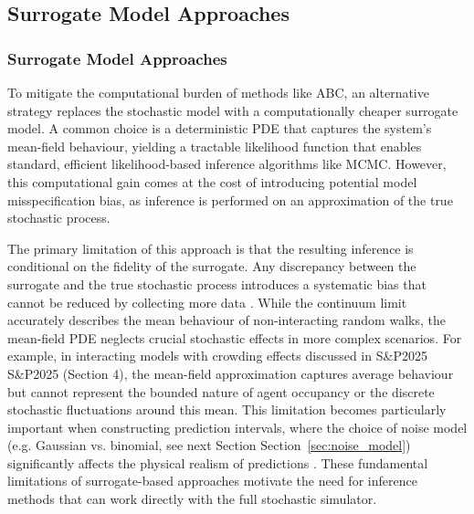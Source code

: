 \documentclass{article}
\newcommand{\SP}{S\&P2025}
\providecommand{\DIFaddtex}[1]{{\protect\color{blue} \sf #1}} %
\providecommand{\DIFdeltex}[1]{{\protect\color{red} \scriptsize #1}} %
\providecommand{\DIFaddbegin}{} %
\providecommand{\DIFaddend}{} %
\providecommand{\DIFdelbegin}{} %
\providecommand{\DIFdelend}{} %
\providecommand{\DIFadd}[1]{\texorpdfstring{\DIFaddtex{#1}}{#1}} %
\providecommand{\DIFdel}[1]{\texorpdfstring{\DIFdeltex{#1}}{}} %
\newcommand{\DIFscaledelfig}{0.5}
\newlength{\DIFdelgraphicswidth} %
\newlength{\DIFdelgraphicsheight} %
\newcommand{\DIFaddincludegraphics}[2][]{{\color{blue}\fbox{\DIFOincludegraphics[#1]{#2}}}} %
\newcommand{\DIFdelincludegraphics}[2][]{%
\sbox{\DIFdelgraphicsbox}{\DIFOincludegraphics[#1]{#2}}%
\settoboxwidth{\DIFdelgraphicswidth}{\DIFdelgraphicsbox} %
\settoboxtotalheight{\DIFdelgraphicsheight}{\DIFdelgraphicsbox} %
\scalebox{\DIFscaledelfig}{%
\parbox[b]{\DIFdelgraphicswidth}{\usebox{\DIFdelgraphicsbox}\\[-\baselineskip] \rule{\DIFdelgraphicswidth}{0em}}\llap{\resizebox{\DIFdelgraphicswidth}{\DIFdelgraphicsheight}{%
\setlength{\unitlength}{\DIFdelgraphicswidth}%
\begin{picture}(1,1)%
\thicklines\linethickness{2pt} %
{\color[rgb]{1,0,0}\put(0,0){\framebox(1,1){}}}%
{\color[rgb]{1,0,0}\put(0,0){\line( 1,1){1}}}%
{\color[rgb]{1,0,0}\put(0,1){\line(1,-1){1}}}%
\end{picture}%
}\hspace*{3pt}}} %
} %
\DeclareRobustCommand{\DIFaddbegin}{\DIFOaddbegin \let\includegraphics\DIFaddincludegraphics} %
\DeclareRobustCommand{\DIFaddend}{\DIFOaddend \let\includegraphics\DIFOincludegraphics} %
\DeclareRobustCommand{\DIFdelbegin}{\DIFOdelbegin \let\includegraphics\DIFdelincludegraphics} %
\DeclareRobustCommand{\DIFdelend}{\DIFOaddend \let\includegraphics\DIFOincludegraphics} %
\begin{document}
\DIFdelbegin \subsection{\DIFdel{Surrogate Model Approaches}}
\addtocounter{subsection}{-1}%
\DIFdelend \DIFaddbegin \subsubsection{\DIFadd{Surrogate Model Approaches}}
\DIFaddend To mitigate the computational burden of methods like ABC, an alternative strategy replaces the stochastic model with a computationally cheaper surrogate model. A common choice is a deterministic PDE that captures the system's mean-field behaviour, yielding a tractable likelihood function \citep{ErbanChapman2009,Baker2010} that enables standard, efficient likelihood-based inference algorithms like MCMC. However, this computational gain comes at the cost of introducing potential model misspecification bias, as inference is performed on an approximation of the true stochastic process.



The primary limitation of this approach is that the resulting inference is conditional on the fidelity of the surrogate. Any discrepancy between the surrogate and the true stochastic process introduces a systematic bias that cannot be reduced by collecting more data \citep{KennedyOHagan2001,BrynjarsdottirOHagan2014}. While the continuum limit accurately describes the mean behaviour of non-interacting random walks, the mean-field PDE neglects crucial stochastic effects in more complex scenarios. For example, in interacting models with crowding effects discussed in \DIFdelbegin \DIFdel{S\&P2025 }\DIFdelend \DIFaddbegin \DIFadd{\SP{} }\DIFaddend (Section 4), the mean-field approximation captures average behaviour but cannot represent the bounded nature of agent occupancy or the discrete stochastic fluctuations \citep{BrunaChapman2012,Baker2010} around this mean. This limitation becomes particularly important when constructing prediction intervals, where the choice of noise model (e.g. Gaussian vs. binomial, see \DIFdelbegin \DIFdel{next Section}\DIFdelend \DIFaddbegin \DIFadd{Section~}\DIFaddend \ref{sec:noise_model}) significantly affects the physical realism of predictions \citep{McCullaghNelder1989,Gelman1995}. These \DIFdelbegin \DIFdel{fundamental }\DIFdelend limitations of surrogate-based approaches motivate the need for inference methods that can work directly with the full stochastic simulator.
\end{document}
